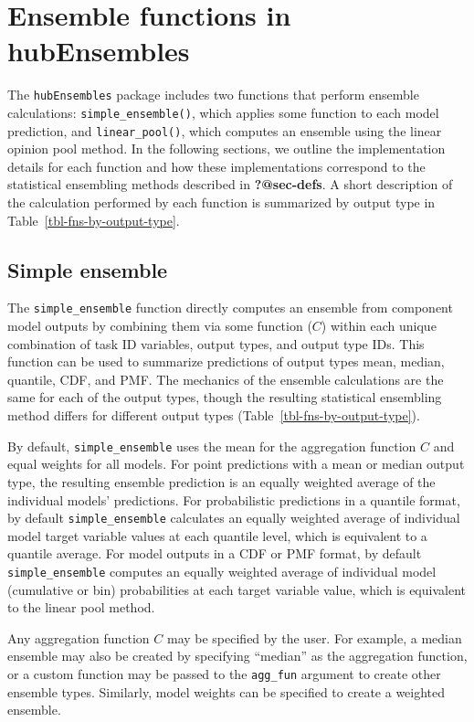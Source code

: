 \documentclass[
  article,
  shortnames,
  notitle]{jss}
\begin{document}
\section{Ensemble functions in hubEnsembles}\label{sec-ens-fns}

The \texttt{hubEnsembles} package includes two functions that perform
ensemble calculations: \texttt{simple\_ensemble()}, which applies some
function to each model prediction, and \texttt{linear\_pool()}, which
computes an ensemble using the linear opinion pool method. In the
following sections, we outline the implementation details for each
function and how these implementations correspond to the statistical
ensembling methods described in \textbf{?@sec-defs}. A short description
of the calculation performed by each function is summarized by output
type in Table~\ref{tbl-fns-by-output-type}.

\subsection{Simple ensemble}\label{simple-ensemble}

The \texttt{simple\_ensemble} function directly computes an ensemble
from component model outputs by combining them via some function (\(C\))
within each unique combination of task ID variables, output types, and
output type IDs. This function can be used to summarize predictions of
output types mean, median, quantile, CDF, and PMF. The mechanics of the
ensemble calculations are the same for each of the output types, though
the resulting statistical ensembling method differs for different output
types (Table~\ref{tbl-fns-by-output-type}).

By default, \texttt{simple\_ensemble} uses the mean for the aggregation
function \(C\) and equal weights for all models. For point predictions
with a mean or median output type, the resulting ensemble prediction is
an equally weighted average of the individual models' predictions. For
probabilistic predictions in a quantile format, by default
\texttt{simple\_ensemble} calculates an equally weighted average of
individual model target variable values at each quantile level, which is
equivalent to a quantile average. For model outputs in a CDF or PMF
format, by default \texttt{simple\_ensemble} computes an equally
weighted average of individual model (cumulative or bin) probabilities
at each target variable value, which is equivalent to the linear pool
method.

Any aggregation function \(C\) may be specified by the user. For
example, a median ensemble may also be created by specifying ``median''
as the aggregation function, or a custom function may be passed to the
\texttt{agg\_fun} argument to create other ensemble types. Similarly,
model weights can be specified to create a weighted ensemble.
\end{document}
